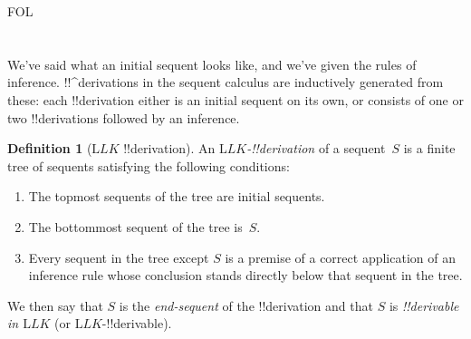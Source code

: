 \documentclass[10pt,a4paper]{article}
\theoremstyle{plain}
\theoremstyle{definition}
\newtheorem{defn}[thm]{Definition}
\theoremstyle{remark}
\newenvironment{explain}{}{}
\newcommand*{\olfileid}[3]{}
\newcommand*{\olsection}[1]{\section*{#1}}
\providecommand{\Log}{\ensuremath{\mathrm{L}}}
\providecommand{\iftag}[1]{#1}
\begin{document}



\iftag{FOL}
      {\olfileid{fol}{seq}{der}}
      {\olfileid{pl}{seq}{der}}

\olsection{}

\begin{explain}
We've said what an initial sequent looks like, and we've given the
rules of inference.  !!^{derivation}s in the sequent calculus are
inductively generated from these: each !!{derivation} either is an
initial sequent on its own, or consists of one or two !!{derivation}s
followed by an inference.
\end{explain}

\begin{defn}[$\Log{LK}$ !!{derivation}]
An \emph{$\Log{LK}$-!!{derivation}} of a sequent~$S$ is a finite tree
of sequents satisfying the following conditions:
\begin{enumerate}
\item The topmost sequents of the tree are initial sequents.
\item The bottommost sequent of the tree is~$S$.
\item Every sequent in the tree except $S$ is a premise of a correct
  application of an inference rule whose conclusion stands directly
  below that sequent in the tree.
\end{enumerate}
We then say that $S$ is the \emph{end-sequent} of the !!{derivation} and
that $S$ is \emph{!!{derivable} in $\Log{LK}$} (or $\Log{LK}$-!!{derivable}).
\end{defn}
\end{document}

